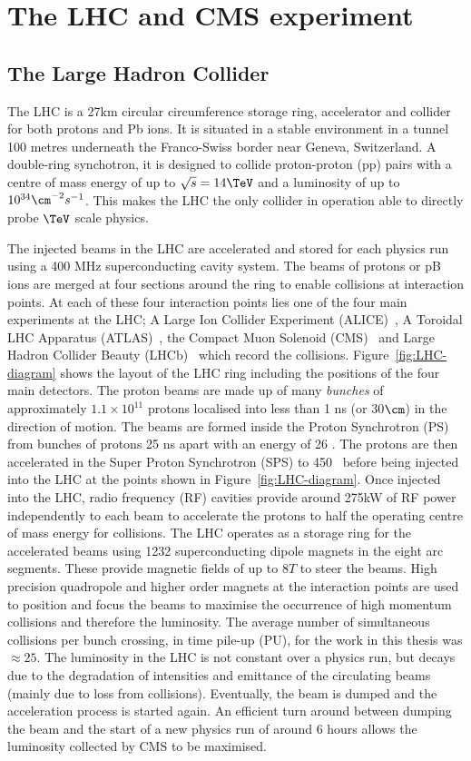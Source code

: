 
\chapter{The LHC and CMS experiment} %
\label{cha:detector}
\section{The Large Hadron Collider}
\label{lhc_intro}
The LHC is a 27km circular circumference storage ring, accelerator and collider for 
both protons and Pb ions. It is situated in a stable environment in a tunnel 
100 metres underneath the Franco-Swiss border near Geneva, Switzerland.
A double-ring synchotron, it is designed to collide proton-proton (pp)
pairs with a centre of mass energy of up to $\sqrt{s}=14\TeV$ and a 
luminosity of up to $10^{34}\cm^{-2}s^{-1}$. This makes the LHC the only collider
in operation able to directly probe $\TeV$ scale physics. 

The injected beams in the LHC are accelerated and stored for each physics run using 
a 400 MHz superconducting cavity system. The beams of protons or pB ions 
are merged at four sections around the ring to enable collisions at interaction points.
At each of these four interaction points lies one of the four main 
experiments at the LHC; A Large Ion Collider Experiment (ALICE)~\cite{ALICE},
A Toroidal LHC Apparatus (ATLAS)~\cite{ATLAS}, the Compact Muon Solenoid (CMS)~\cite{CMS}
and Large Hadron Collider Beauty (LHCb)~\cite{LHCb} which record the collisions. Figure~\ref{fig:LHC-diagram} shows the layout of the LHC ring including
the positions of the four main detectors. The proton beams are made up of many \emph{bunches} of approximately $1.1\times10^{11}$
protons localised into less than 1 ns (or 30$\cm$) in the direction of motion.
The beams are formed inside the Proton Synchrotron (PS) from bunches of protons 25 ns apart with an energy of 26 \GeV. 
The protons are then accelerated in the Super Proton Synchrotron (SPS) to 450 \GeV~before being injected into the LHC at
the points shown in Figure~\ref{fig:LHC-diagram}. Once injected into the LHC, radio frequency (RF) cavities 
provide around 275kW of RF power independently to each beam to accelerate the protons
to half the operating centre of mass energy for collisions.
The LHC operates as a storage ring for the accelerated beams using 1232 
superconducting dipole magnets in the eight arc segments. These provide magnetic fields of up to $8T$ to steer the beams. 
High precision quadropole and higher order magnets at the interaction points are used to position and focus the beams to 
maximise the occurrence of high momentum collisions and therefore the luminosity. The average number of simultaneous collisions
per bunch crossing, in time pile-up (PU), for the work in this thesis was $\approx25$.
The luminosity in the LHC is not constant over a physics run, but decays due to the degradation 
of intensities and emittance of the circulating beams (mainly due to loss from collisions). Eventually,
the beam is dumped and the acceleration process is started again. An efficient turn around between
dumping the beam and the start of a new physics run of 
around 6 hours allows the luminosity collected by CMS to be maximised. 

